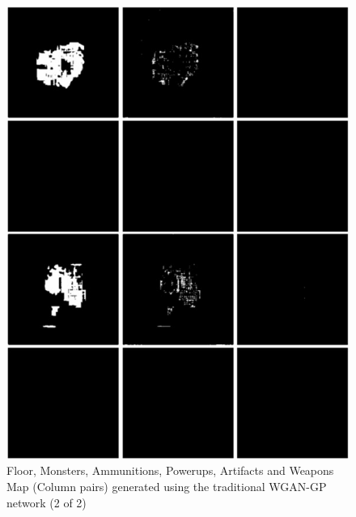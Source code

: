 \documentclass{Configuration_Files/PoliMi3i_thesis}
\begin{document}
\begin{figure}[H]
    \centering
    \includegraphics[width=1\textwidth]{wgan_sample2.jpg}
    \caption[Samples generated using the traditional WGAN-GP architecture (2 of 2)]{Floor, Monsters, Ammunitions, Powerups, Artifacts and Weapons Map 
(Column pairs) generated using the traditional WGAN-GP network (2 of 2)}
    \label{fig:wgansample1}
\end{figure}
\end{document}
